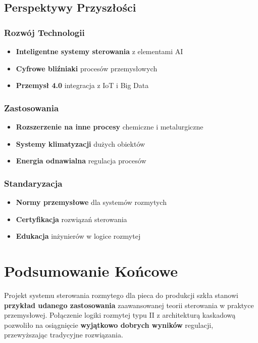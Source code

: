 \documentclass[12pt,a4paper]{article}
\begin{document}
\subsection{Perspektywy Przyszłości}

\subsubsection{Rozwój Technologii}
\begin{itemize}
    \item \textbf{Inteligentne systemy sterowania} z elementami AI
    \item \textbf{Cyfrowe bliźniaki} procesów przemysłowych
    \item \textbf{Przemysł 4.0} integracja z IoT i Big Data
\end{itemize}

\subsubsection{Zastosowania}
\begin{itemize}
    \item \textbf{Rozszerzenie na inne procesy} chemiczne i metalurgiczne
    \item \textbf{Systemy klimatyzacji} dużych obiektów
    \item \textbf{Energia odnawialna} regulacja procesów
\end{itemize}

\subsubsection{Standaryzacja}
\begin{itemize}
    \item \textbf{Normy przemysłowe} dla systemów rozmytych
    \item \textbf{Certyfikacja} rozwiązań sterowania
    \item \textbf{Edukacja} inżynierów w logice rozmytej
\end{itemize}

\section{Podsumowanie Końcowe}

Projekt systemu sterowania rozmytego dla pieca do produkcji szkła stanowi \textbf{przykład udanego zastosowania} zaawansowanej teorii sterowania w praktyce przemysłowej. Połączenie logiki rozmytej typu II z architekturą kaskadową pozwoliło na osiągnięcie \textbf{wyjątkowo dobrych wyników} regulacji, przewyższając tradycyjne rozwiązania.
\end{document}
